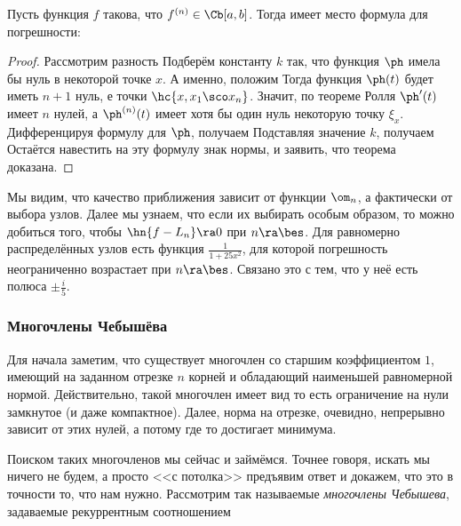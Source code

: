 \documentclass[a4paper]{article}
\begin{document}
\begin{theorem}\label{thm:LargangeErrorTheorem}
Пусть функция $f$ такова, что $f^{(n)}\in\Cb[a,b]$. Тогда имеет место
формула для погрешности: 
\end{theorem}
\begin{proof}
Рассмотрим разность 
Подберём константу $k$ так, что функция $\ph$ имела бы нуль в
некоторой точке $x$. А именно, положим  Тогда функция $\ph(t)$ будет иметь
$n+1$ нуль, е точки $\hc{x,x_1\sco x_n}$.  Значит, по теореме Ролля
$\ph'(t)$ имеет $n$ нулей, а $\ph^{(n)}(t)$ имеет хотя бы один нуль
некоторую точку $\xi_x$.  Дифференцируя формулу для $\ph$, получаем
  Подставляя значение $k$,
получаем 
Остаётся навестить на эту формулу знак нормы, и заявить, что теорема
доказана.
\end{proof}

\begin{note}
Мы видим, что качество приближения зависит от функции $\om_n$, а
фактически от выбора узлов.  Далее мы узнаем, что если их выбирать
особым образом, то можно добиться того, чтобы $\hn{f-L_n} \ra 0$ при
$n\ra\bes$. Для равномерно распределённых узлов есть функция
$\frac{1}{1+25x^2}$, для которой погрешность неограниченно возрастает
при $n\ra\bes$. Связано это с тем, что у неё есть полюса $\pm
\frac{i}{5}$.
\end{note}

\subsubsection{Многочлены Чебышёва}

Для начала заметим, что существует многочлен со старшим коэффициентом
$1$, имеющий на заданном отрезке $n$ корней и обладающий наименьшей
равномерной нормой. Действительно, такой многочлен имеет вид
 то есть ограничение
на нули замкнутое (и даже компактное). Далее, норма на отрезке,
очевидно, непрерывно зависит от этих нулей, а потому где то достигает
минимума.

Поиском таких многочленов мы сейчас и займёмся. Точнее говоря, искать
мы ничего не будем, а просто <<с потолка>> предъявим ответ и докажем,
что это в точности то, что нам нужно. Рассмотрим так называемые
\emph{многочлены Чебышева}, задаваемые рекуррентным соотношением
\end{document}
